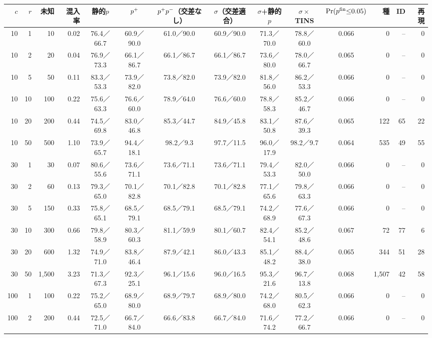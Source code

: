 {\fontsize{6.0pt}{7.1pt}\selectfont\renewcommand{\arraystretch}{1.0}%
\setlength{\tabcolsep}{1.4pt}\begin{tabular}{@{}rrrr|cccccc|c|rrr@{}}
\hline
\rule[-2.0pt]{0pt}{8.2pt}$c$ & $r$ & 未知 & 混入率 & 静的$p$ & $p^{+}$ & $p^{+}p^{-}$（交差なし） & $\sigma$（交差適合） & $\sigma$+静的$p$ & $\sigma\times$TINS & $\Pr(p^{\mathrm{fin}}{\le}0.05)$ & 種 & ID & 再現 \\
\hline
10 & 1 & 10 & 0.02 & 76.4／66.7 & 60.9／90.0 & 61.0／90.0 & 60.9／90.0 & 71.3／70.0 & 78.8／60.0 & 0.066 & 0 & -- & 0 \\
10 & 2 & 20 & 0.04 & 76.9／73.3 & 66.1／86.7 & 66.1／86.7 & 66.1／86.7 & 73.6／80.0 & 78.0／66.7 & 0.065 & 0 & -- & 0 \\
10 & 5 & 50 & 0.11 & 83.3／53.3 & 73.9／82.0 & 73.8／82.0 & 73.9／82.0 & 81.8／56.0 & 86.2／53.3 & 0.066 & 0 & -- & 0 \\
10 & 10 & 100 & 0.22 & 75.6／63.3 & 76.6／60.0 & 78.9／64.0 & 76.6／60.0 & 78.8／58.3 & 85.2／46.7 & 0.066 & 0 & -- & 0 \\
10 & 20 & 200 & 0.44 & 74.5／69.8 & 83.0／46.8 & 85.3／44.7 & 84.9／45.8 & 83.1／50.8 & 87.6／39.3 & 0.065 & 122 & 65 & 22 \\
10 & 50 & 500 & 1.10 & 73.9／65.7 & 94.4／18.1 & 98.2／9.3 & 97.7／11.5 & 96.0／17.9 & 98.2／9.7 & 0.064 & 535 & 49 & 55 \\
30 & 1 & 30 & 0.07 & 80.6／55.6 & 73.6／71.1 & 73.6／71.1 & 73.6／71.1 & 79.4／53.3 & 82.0／50.0 & 0.066 & 0 & -- & 0 \\
30 & 2 & 60 & 0.13 & 79.3／65.0 & 70.1／82.8 & 70.1／82.8 & 70.1／82.8 & 77.1／65.6 & 79.8／63.3 & 0.066 & 0 & -- & 0 \\
30 & 5 & 150 & 0.33 & 75.8／65.1 & 68.5／79.1 & 68.5／79.1 & 68.5／79.1 & 74.2／68.9 & 77.6／67.3 & 0.066 & 0 & -- & 0 \\
30 & 10 & 300 & 0.66 & 79.8／58.9 & 80.3／60.3 & 81.1／59.9 & 80.1／60.7 & 82.4／54.1 & 85.2／48.6 & 0.067 & 72 & 77 & 6 \\
30 & 20 & 600 & 1.32 & 74.9／71.0 & 83.8／46.4 & 87.9／42.1 & 86.0／43.3 & 85.1／48.2 & 88.4／38.0 & 0.065 & 344 & 51 & 28 \\
30 & 50 & 1,500 & 3.23 & 71.3／67.3 & 92.3／25.1 & 96.1／15.6 & 96.0／16.5 & 95.3／21.6 & 96.7／13.8 & 0.068 & 1,507 & 42 & 58 \\
100 & 1 & 100 & 0.22 & 75.2／65.0 & 68.9／80.0 & 68.9／79.7 & 68.9／80.0 & 74.2／68.0 & 80.5／62.3 & 0.066 & 0 & -- & 0 \\
100 & 2 & 200 & 0.44 & 72.5／71.0 & 66.7／84.0 & 66.6／83.8 & 66.7／84.0 & 71.6／74.2 & 77.2／66.7 & 0.066 & 0 & -- & 0 \\

\end{tabular}}
